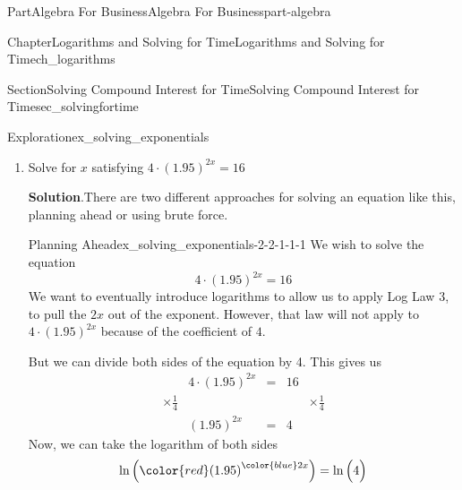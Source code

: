 \documentclass{tufte-book}
\newcommand{\blocktitlefont}{\relax}
\numberwithin{equation}{chapter}
\newcommand{\amp}{&}
\begin{document}
\begin{partptx}{Part}{Algebra For Business}{}{Algebra For Business}{}{}{part-algebra}
\begin{chapterptx}{Chapter}{Logarithms and Solving for Time}{}{Logarithms and Solving for Time}{}{}{ch_logarithms}
\begin{sectionptx}{Section}{Solving Compound Interest for Time}{}{Solving Compound Interest for Time}{}{}{sec_solvingfortime}
\begin{exploration}{Exploration}{}{ex_solving_exponentials}
\begin{enumerate}[font=\bfseries,label=(\alph*),ref=\alph*]
\begin{equation*}
3x \cdot 0.693{\dots} = 1.609\dots
\end{equation*}
Rearranging the left side, we have%
\begin{equation*}
3\cdot 0.693{\dots}\cdot x = 1.609\dots
\end{equation*}
Using a calculator, we see that \(3\cdot 0.693\dots = 2.079\dots\), which gives%
\begin{equation*}
2.079\dots x = 1.609\dots 
\end{equation*}
Dividing both sides by \(2.079\dots\), we get%
\begin{equation*}
x = \dfrac{1.609\dots}{2.079\dots} = 0.773\dots
\end{equation*}
You could also have done this with the original \(3x \cdot \ln\Big(2\Big) = \ln\Big( 5 \Big)\) by dividing both sides by \(3\cdot\ln(2)\) to get%
\begin{equation*}
x = \dfrac{\ln(5)}{3\cdot \ln(2)}
\end{equation*}
%
\item{}Solve for \(x\) satisfying \(4\cdot(1.95)^{2x} = 16\)%
\par\smallskip%
\noindent\textbf{\blocktitlefont Solution}.\hypertarget{ex_solving_exponentials-2-2}{}\quad{}There are two different approaches for solving an equation like this, planning ahead or using brute force.%
\begin{descriptionlist}
\begin{dlimedium}{Planning Ahead}{ex_solving_exponentials-2-2-1-1-1}%
We wish to solve the equation%
\begin{equation*}
4\cdot(1.95)^{2x} = 16
\end{equation*}
We want to eventually introduce logarithms to allow us to apply Log Law 3, to pull the \(2x\) out of the exponent. However, that law will not apply to \(4\cdot (1.95)^{2x}\) because of the coefficient of \(4\).%
\par
But we can divide both sides of the equation by 4.  This gives us%
\begin{align*}
\amp 4\cdot (1.95)^{2x} \amp = \amp 16 \amp \\
\times\frac{1}{4} \amp \amp\amp \amp \times\frac{1}{4} \\
\amp (1.95)^{2x} \amp = \amp 4 \amp 
\end{align*}
Now, we can take the logarithm of both sides%
\begin{equation*}
\ln\Big( {\color{red}(1.95)}^{\color{blue}2x} \Big) = \ln\Big( 4 \Big)
\end{equation*}

\end{dlimedium}
\end{descriptionlist}
\end{enumerate}
\end{exploration}
\end{sectionptx}
\end{chapterptx}
\end{partptx}
\end{document}
